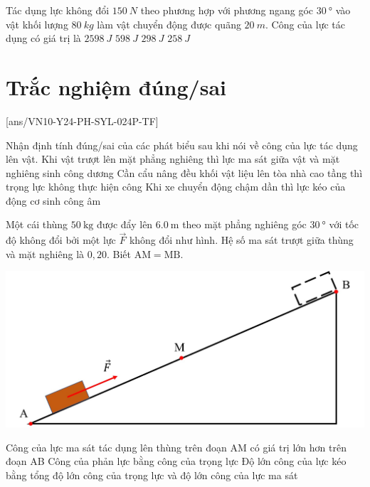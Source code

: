 \begin{ex}
Tác dụng lực không đổi $\SI{150}{N}$ theo phương hợp với phương ngang góc $\SI{30}{\degree}$ vào vật khối lượng $\SI{80}{kg}$ làm vật chuyển động được quãng $\SI{20}{m}$. Công của lực tác dụng có giá trị là	
	\choice
	{\True $\SI{2598}{J}$}
	{$\SI{598}{J}$}
	{$\SI{298}{J}$}
	{$\SI{258}{J}$}
\end{ex}
\section{Trắc nghiệm đúng/sai}
\setcounter{ex}{0}
[ans/VN10-Y24-PH-SYL-024P-TF]
\begin{ex}
	Nhận định tính đúng/sai của các phát biểu sau khi nói về công của lực tác dụng lên vật.
	{Khi vật trượt lên mặt phẳng nghiêng thì lực ma sát giữa vật và mặt nghiêng sinh công dương}
	{Cần cẩu nâng đều khối vật liệu lên tòa nhà cao tầng thì trọng lực không thực hiện công}
	{Khi xe chuyển động chậm dần thì lực kéo của động cơ sinh công âm}
	\loigiai{}
\end{ex}
\begin{ex}
	Một cái thùng $\SI{50}{\kilogram}$ được đẩy lên $\SI{6.0}{\meter}$ theo mặt phẳng nghiêng góc $\SI{30}{\degree}$ với tốc độ  không đổi bởi một lực $\vec{F}$ không đổi như hình. Hệ số ma sát trượt giữa thùng và mặt nghiêng là $0,20$. Biết $\mathrm{AM}=\mathrm{MB}$.
	\begin{center}
		\includegraphics[width=0.5\linewidth]{../figs/VN10-2023-PH-TP024-P-8}
	\end{center}
	{Công của lực ma sát tác dụng lên thùng trên đoạn AM có giá trị lớn hơn trên đoạn AB}
	{Công của phản lực bằng công của trọng lực}
	{Độ lớn công của lực kéo bằng tổng độ lớn công của trọng lực và độ lớn công của lực ma sát}
	\loigiai{}
\end{ex}
